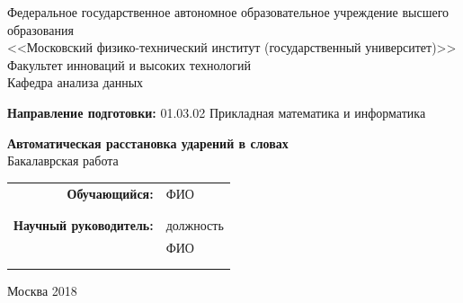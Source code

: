 \documentclass[14pt, a4paper, russian]{report}
\begin{document}
\begin{center}
\hfill \break
\small{Федеральное государственное автономное образовательное учреждение \linebreak 
высшего образования}\\ 
\small{<<Московский физико-технический институт (государственный университет)>>}\\
\hfill \break
\small{Факультет инноваций и высоких технологий}\\
\small{Кафедра анализа данных}\\
\end{center}
\small{\textbf{Направление подготовки:} 01.03.02 Прикладная математика и информатика}\\
\hfill \break
\hfill \break
\hfill \break
\hfill \break
\begin{center}
\normalsize{\textbf{Автоматическая расстановка ударений в словах}}\\
\small{Бакалаврская работа}\\
\hfill \break
\hfill \break
\end{center}
 
\hfill \break
 
\begin{flushright}
\small{ 
\begin{tabular}{rl}
\textbf{Обучающийся:} & ФИО \\
 & \underline{\hspace{3cm}} \\\\
\textbf{Научный руководитель:} & должность\\
            & ФИО \\
 & \underline{\hspace{3cm}} \\\\
\end{tabular}
}
\end{flushright}

\hfill \break
\hfill \break
\hfill \break
\hfill \break
\begin{center} Москва 2018 \end{center}
\thispagestyle{empty} %
 
 
\end{document}
